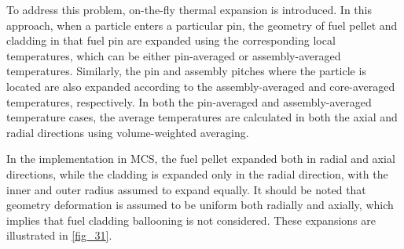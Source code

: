 To address this problem, on-the-fly thermal expansion is introduced. In this approach, when a particle enters a particular pin, the geometry of fuel pellet and cladding in that fuel pin are expanded using the corresponding local temperatures, which can be either pin-averaged or assembly-averaged temperatures. Similarly, the pin and assembly pitches where the particle is located are also expanded according to the assembly-averaged and core-averaged temperatures, respectively. In both the pin-averaged and assembly-averaged temperature cases, the average temperatures are calculated in both the axial and radial directions using volume-weighted averaging.

In the implementation in MCS, the fuel pellet expanded both in radial and axial directions, while the cladding is expanded only in the radial direction, with the inner and outer radius assumed to expand equally. It should be noted that geometry deformation is assumed to be uniform both radially and axially, which implies that fuel cladding ballooning is not considered. These expansions are illustrated in \ref{fig_31}.

